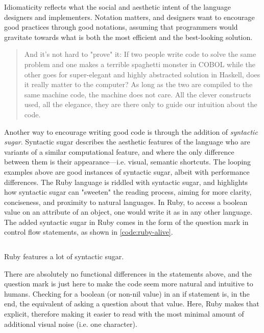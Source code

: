 Idiomaticity reflects what the social and aesthetic intent of the language designers and implementers. Notation matters, and designers want to encourage good practices through good notations, assuming that programmers would gravitate towards what is both the most efficient and the best-looking solution.

\begin{quote}
  And it's not hard to "prove" it: If two people write code to solve the same problem and one makes a terrible spaghetti monster in COBOL while the other goes for super-elegant and highly abstracted solution in Haskell, does it really matter to the computer? As long as the two are compiled to the same machine code, the machine does not care. All the clever constructs used, all the elegance, they are there only to guide our intuition about the code. \citep{sustrik_nature_2021}
\end{quote}

Another way to encourage writing good code is through the addition of \emph{syntactic sugar}. Syntactic sugar describes the aesthetic features of the language who are variants of a similar computational feature, and where the only difference between them is their appearance—i.e. visual, semantic shortcuts. The looping examples above are good instances of syntactic sugar, albeit with performance differences. The Ruby language is riddled with syntactic sugar, and highlights how syntactic sugar can "sweeten" the reading process, aiming for more clarity, conciseness, and proximity to natural languages. In Ruby, to access a boolean value on an attribute of an object, one would write it as in any other language. The added syntactic sugar in Ruby comes in the form of the question mark in control flow statements, as shown in \ref{code:ruby-alive}.

\begin{listing}
  \inputminted{python}{./corpus/alive.rb}
  \caption{Ruby features a lot of syntactic sugar.}
  \label{code:ruby-alive}
\end{listing}

There are absolutely no functional differences in the statements above, and the question mark is just here to make the code seem more natural and intuitive to humans. Checking for a boolean (or non-nil value) in an if statement is, in the end, the equivalent of asking a question about that value. Here, Ruby makes that explicit, therefore making it easier to read with the most minimal amount of additional visual noise (i.e. one character).

